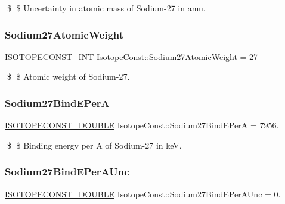 \$ \$ Uncertainty in atomic mass of Sodium-\/27 in amu. \mbox{\label{group___isotope_const-_sodium-_na27_gad967dbea8eb79487be1c4f3cca234b0d}} 
\subsubsection{\texorpdfstring{Sodium27\+Atomic\+Weight}{Sodium27AtomicWeight}}
{\footnotesize\ttfamily \mbox{\hyperlink{group___isotope_const-_macros_ga5f18360b3e99483a35c32d789e62621c}{I\+S\+O\+T\+O\+P\+E\+C\+O\+N\+S\+T\+\_\+\+I\+NT}} Isotope\+Const\+::\+Sodium27\+Atomic\+Weight = 27}

\$ \$ Atomic weight of Sodium-\/27. \mbox{\label{group___isotope_const-_sodium-_na27_gabb1f59480978a67e65061717e4170440}} 
\subsubsection{\texorpdfstring{Sodium27\+Bind\+E\+PerA}{Sodium27BindEPerA}}
{\footnotesize\ttfamily \mbox{\hyperlink{group___isotope_const-_macros_ga8f45a7272ce02c0b4c65c44636ed719a}{I\+S\+O\+T\+O\+P\+E\+C\+O\+N\+S\+T\+\_\+\+D\+O\+U\+B\+LE}} Isotope\+Const\+::\+Sodium27\+Bind\+E\+PerA = 7956.}

\$ \$ Binding energy per A of Sodium-\/27 in keV. \mbox{\label{group___isotope_const-_sodium-_na27_ga16a112cc66458cd7e42f13b24504d642}} 
\subsubsection{\texorpdfstring{Sodium27\+Bind\+E\+Per\+A\+Unc}{Sodium27BindEPerAUnc}}
{\footnotesize\ttfamily \mbox{\hyperlink{group___isotope_const-_macros_ga8f45a7272ce02c0b4c65c44636ed719a}{I\+S\+O\+T\+O\+P\+E\+C\+O\+N\+S\+T\+\_\+\+D\+O\+U\+B\+LE}} Isotope\+Const\+::\+Sodium27\+Bind\+E\+Per\+A\+Unc = 0.}

